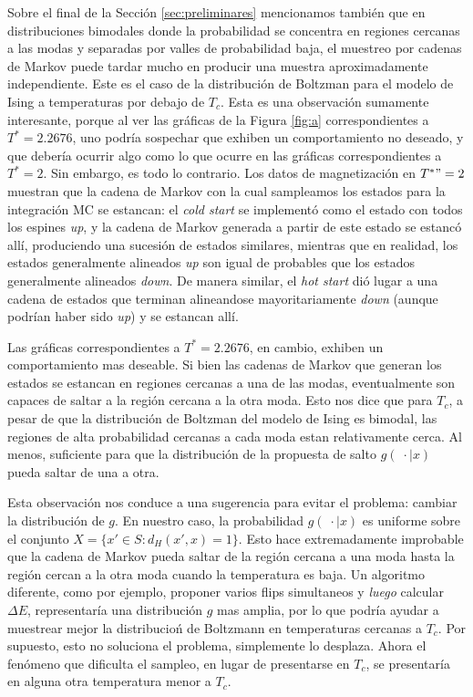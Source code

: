 \documentclass[a4paper,12pt]{article}
\begin{document}
Sobre el final de la Sección \ref{sec:preliminares} mencionamos también que en distribuciones bimodales donde la probabilidad se concentra en regiones cercanas a las modas y separadas por valles de probabilidad baja, el muestreo por cadenas de Markov puede tardar mucho en producir una muestra aproximadamente independiente. Este es el caso de la distribución de Boltzman para el modelo de Ising a temperaturas por debajo de $T_c$. Esta es una observación sumamente interesante, porque al ver las gráficas de la Figura \ref{fig:a} correspondientes a $T^* = 2.2676$, uno podría sospechar que exhiben un comportamiento no deseado, y que debería ocurrir algo como lo que ocurre en las gráficas correspondientes a $T^* = 2$. Sin embargo, es todo lo contrario. Los datos de magnetización en $T^*"= 2$ muestran que la cadena de Markov con la cual sampleamos los estados para la integración MC se estancan: el {\it cold start} se implementó como el estado con todos los espines {\it up}, y la cadena de Markov generada a partir de este estado se estancó allí, produciendo una sucesión de estados similares, mientras que en realidad, los estados generalmente alineados {\it up} son igual de probables que los estados generalmente alineados {\it down}. De manera similar, el {\it hot start} dió lugar a una cadena de estados que terminan alineandose mayoritariamente {\it down} (aunque podrían haber sido {\it up}) y se estancan allí.

Las gráficas correspondientes a $T^* = 2.2676$, en cambio, exhiben un comportamiento mas deseable. Si bien las cadenas de Markov que generan los estados se estancan en regiones cercanas a una de las modas, eventualmente son capaces de saltar a la región cercana a la otra moda. Esto nos dice que para $T_c$, a pesar de que la distribución de Boltzman del modelo de Ising es bimodal, las regiones de alta probabilidad cercanas a cada moda estan relativamente cerca. Al menos, suficiente para que la distribución de la propuesta de salto $g(\; \cdot \mid x)$ pueda saltar de una a otra.

Esta observación nos conduce a una sugerencia para evitar el problema: cambiar la distribución de $g$. En nuestro caso, la probabilidad $g(\; \cdot \mid x)$ es uniforme sobre el conjunto $X = \{x' \in S : d_H(x', x) = 1 \}$. Esto hace extremadamente improbable que la cadena de Markov pueda saltar de la región cercana a una moda hasta la región cercan a la otra moda cuando la temperatura es baja. Un algoritmo diferente, como por ejemplo, proponer varios flips simultaneos y {\it luego} calcular $\Delta E$, representaría una distribución $g$ mas amplia, por lo que podría ayudar a muestrear mejor la distribucioń de Boltzmann en temperaturas cercanas a $T_c$. Por supuesto, esto no soluciona el problema, simplemente lo desplaza. Ahora el fenómeno que dificulta el sampleo, en lugar de presentarse en $T_c$, se presentaría en alguna otra temperatura menor a $T_c$.
\end{document}
